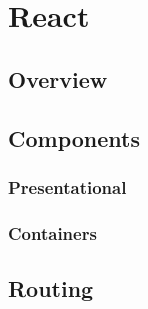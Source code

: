 \section{React} 
\subsection{Overview} %
\subsection{Components} %
\subsubsection{Presentational} %
\subsubsection{Containers} %
\subsection{Routing} %
